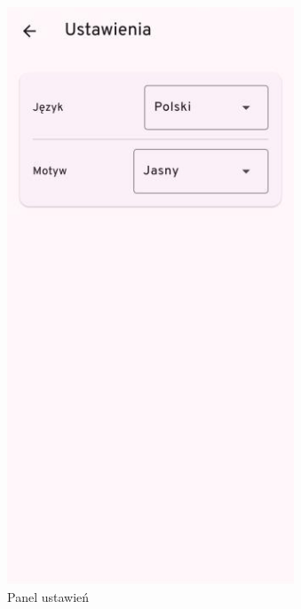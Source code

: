 \clearpage
\begin{figure}[H]
	\centering
	\begin{minipage}[b]{0.45\textwidth}
		\centering
		\includegraphics[width=\textwidth]{root/raptchat_settings.png}
		\caption{Panel ustawień}

\end{minipage}
\end{figure}
